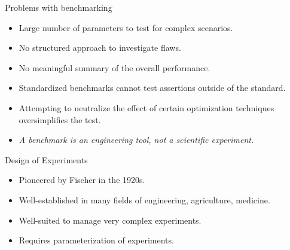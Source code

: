 \documentclass[english,usenames,dvipsnames,aspectratio=169]{beamer}
\begin{document}
\begin{frame}{Problems with benchmarking}

\begin{itemize}
\item Large number of parameters to test for complex scenarios.
\item No structured approach to investigate flaws.
\item No meaningful summary of the overall performance.
\item Standardized benchmarks cannot test assertions outside of the
  standard.
\item Attempting to neutralize the effect of certain optimization
  techniques oversimplifies the test.
\item \emph{A benchmark is an engineering tool, not a scientific experiment.}
\end{itemize}
\end{frame}

\begin{frame}{Design of Experiments}

  \begin{itemize}
  \item Pioneered by Fischer in the 1920s.
  \item Well-established in many fields of engineering, agriculture,
    medicine.
  \item Well-suited to manage very complex experiments.
  \item Requires parameterization of experiments.
  \end{itemize}
\end{frame}
\end{document}
